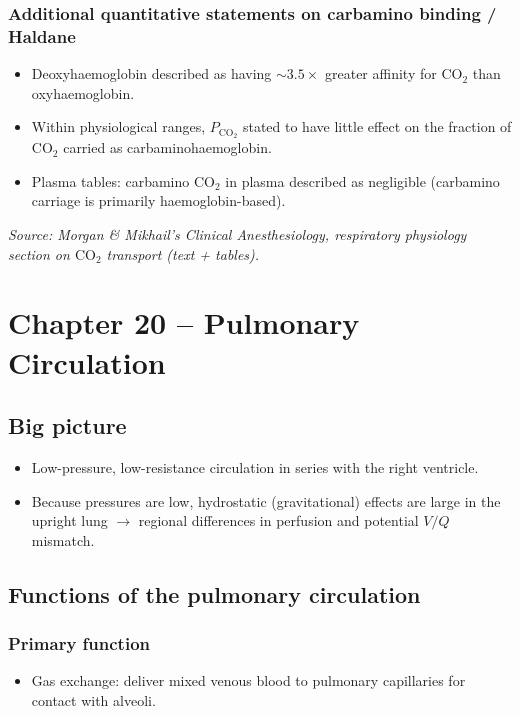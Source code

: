 \documentclass[11pt,a4paper]{article}
\begin{document}
\subsubsection{Additional quantitative statements on carbamino binding / Haldane}
\begin{itemize}
  \item Deoxyhaemoglobin described as having \(\sim 3.5\times\) greater affinity for \(\mathrm{CO_2}\) than oxyhaemoglobin.
  \item Within physiological ranges, \(P_{\mathrm{CO_2}}\) stated to have little effect on the fraction of \(\mathrm{CO_2}\) carried as carbaminohaemoglobin.
  \item Plasma tables: carbamino \(\mathrm{CO_2}\) in plasma described as negligible (carbamino carriage is primarily haemoglobin-based).
\end{itemize}
\textit{Source: Morgan \& Mikhail’s Clinical Anesthesiology, respiratory physiology section on \(\mathrm{CO_2}\) transport (text + tables).}



\section{Chapter 20 -- Pulmonary Circulation}

\subsection{Big picture}
\begin{itemize}
  \item Low-pressure, low-resistance circulation in series with the right ventricle.
  \item Because pressures are low, hydrostatic (gravitational) effects are large in the upright lung \(\rightarrow\) regional differences in perfusion and potential \(V/Q\) mismatch.
\end{itemize}

\subsection{Functions of the pulmonary circulation}
\subsubsection{Primary function}
\begin{itemize}
  \item Gas exchange: deliver mixed venous blood to pulmonary capillaries for contact with alveoli.
\end{itemize}
\end{document}
